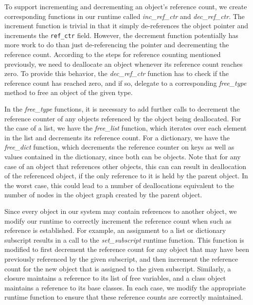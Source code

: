 \documentclass{sigplanconf}
\newcommand{\afunction}[1]{\textit{#1}}
\newcommand{\afield}[1]{\texttt{#1}}
\begin{document}
To support incrementing and decrementing an object's reference count, we create corresponding functions in our runtime called \afunction{inc\_ref\_ctr} and \afunction{dec\_ref\_ctr}.  The increment function is trivial in that it simply de-references the object pointer and increments the \afield{ref\_ctr} field.   However, the decrement function potentially has more work to do than just de-referencing the pointer and decrementing the reference count.  According to the steps for reference counting mentioned previously, we need to deallocate an object whenever its reference count reaches zero.  To provide this behavior, the \afunction{dec\_ref\_ctr} function has to check if the reference count has reached zero, and if so, delegate to a corresponding \afunction{free\_\textit{type}} method to free an object of the given type.

In the \afunction{free\_\textit{type}} functions, it is necessary to add further calls to decrement the reference counter of any objects referenced by the object being deallocated.  For the case of a list, we have the \afunction{free\_list} function, which iterates over each element in the list and decrements its reference count.  For a dictionary, we have the \afunction{free\_dict} function, which decrements the reference counter on keys as well as values contained in the dictionary, since both can be objects.  Note that for any case of an object that references other objects, this can can result in deallocation of the referenced object, if the only reference to it is held by the parent object.  In the worst case, this could lead to a number of deallocations equivalent to the number of nodes in the object graph created by the parent object.  

Since every object in our system may contain references to another object, we modify our runtime to correctly increment the reference count when such as reference is established.  For example, an assignment to a list or dictionary subscript results in a call to the \afunction{set\_subscript} runtime function.  This function is modified to first decrement the reference count for any object that may have been previously referenced by the given subscript, and then increment the reference count for the new object that is assigned to the given subscript.  Similarly, a closure maintains a reference to its list of free variables, and a class object maintains a reference to its base classes.  In each case, we modify the appropriate runtime function to ensure that these reference counts are correctly maintained.  
\end{document}
